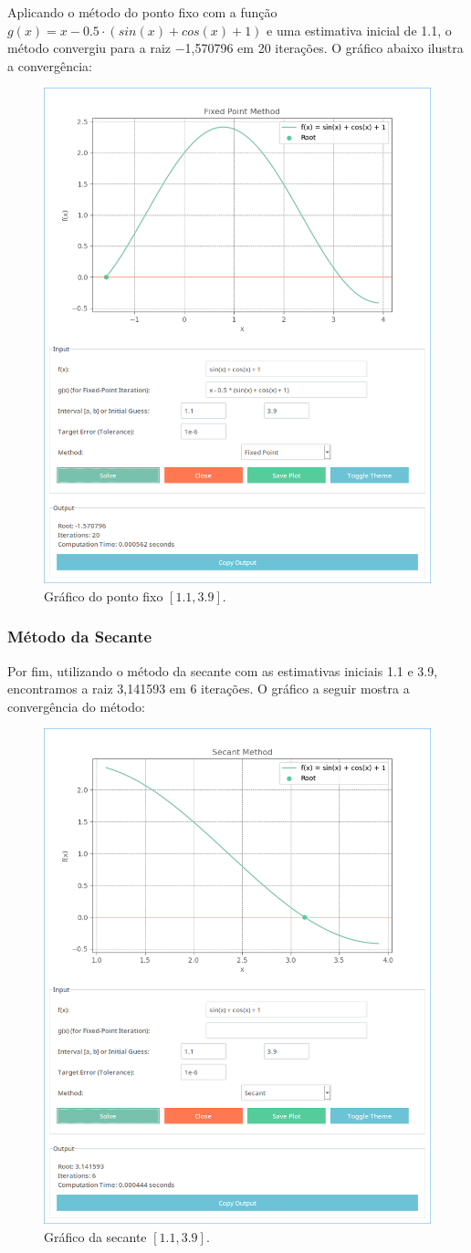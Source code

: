 Aplicando o método do ponto fixo com a função \\ $g(x) = x - 0.5 ⋅ (sin(x) +
	cos(x) + 1)$ e uma estimativa inicial de 1.1, o método convergiu para a raiz
−1,570796 em 20 iterações. O gráfico abaixo ilustra a convergência:

\begin{figure}[H]
	\centering
	\setlength{\fboxsep}{0pt}
	\includegraphics[height=0.5\textwidth]{./fig/ponto-fixo.png}
	\caption{Gráfico do ponto fixo $[1.1, 3.9]$.}
	\label{fig:grafico-pf}
\end{figure}

\subsubsection{\textbf{Método da Secante}}
Por fim, utilizando o método da secante com as estimativas iniciais 1.1 e 3.9,
encontramos a raiz
3,141593 em 6 iterações. O gráfico a seguir mostra a convergência do método:

\begin{figure}[H]
	\centering
	\setlength{\fboxsep}{0pt}
	\includegraphics[height=0.5\textwidth]{./fig/secante.png}
	\caption{Gráfico da secante $[1.1, 3.9]$.}
	\label{fig:grafico-sec}
\end{figure}


